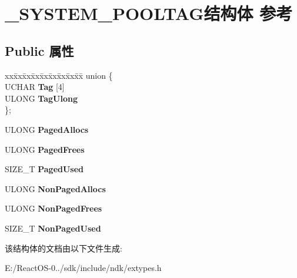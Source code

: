 \hypertarget{struct___s_y_s_t_e_m___p_o_o_l_t_a_g}{}\section{\+\_\+\+S\+Y\+S\+T\+E\+M\+\_\+\+P\+O\+O\+L\+T\+A\+G结构体 参考}
\label{struct___s_y_s_t_e_m___p_o_o_l_t_a_g}
\subsection*{Public 属性}
\begin{DoxyCompactItemize}
\item 
\mbox{\label{struct___s_y_s_t_e_m___p_o_o_l_t_a_g_aaf0a652fc71f99a54af09694a48c6b27}} 
\begin{tabbing}
xx\=xx\=xx\=xx\=xx\=xx\=xx\=xx\=xx\=\kill
union \{\\
\>UCHAR {\bfseries Tag} \mbox{[}4\mbox{]}\\
\>ULONG {\bfseries TagUlong}\\
\}; \\

\end{tabbing}\item 
\mbox{\label{struct___s_y_s_t_e_m___p_o_o_l_t_a_g_a2e13420506540ed96c871c28a1d83d63}} 
U\+L\+O\+NG {\bfseries Paged\+Allocs}
\item 
\mbox{\label{struct___s_y_s_t_e_m___p_o_o_l_t_a_g_a1cfe722002dcd5d21fd29c139b16d90a}} 
U\+L\+O\+NG {\bfseries Paged\+Frees}
\item 
\mbox{\label{struct___s_y_s_t_e_m___p_o_o_l_t_a_g_a0fb6684e0abac3097e72485ecd6cd24b}} 
S\+I\+Z\+E\+\_\+T {\bfseries Paged\+Used}
\item 
\mbox{\label{struct___s_y_s_t_e_m___p_o_o_l_t_a_g_a6aa5f8e7f3fc9d32c04ef0c5a43c8900}} 
U\+L\+O\+NG {\bfseries Non\+Paged\+Allocs}
\item 
\mbox{\label{struct___s_y_s_t_e_m___p_o_o_l_t_a_g_ab6df8aaca3d330734abc24054e94382a}} 
U\+L\+O\+NG {\bfseries Non\+Paged\+Frees}
\item 
\mbox{\label{struct___s_y_s_t_e_m___p_o_o_l_t_a_g_a9f23ed27b97dc83e347b82a6faae0f46}} 
S\+I\+Z\+E\+\_\+T {\bfseries Non\+Paged\+Used}
\end{DoxyCompactItemize}


该结构体的文档由以下文件生成\+:\begin{DoxyCompactItemize}
\item 
E\+:/\+React\+O\+S-\/0../sdk/include/ndk/extypes.\+h\end{DoxyCompactItemize}
